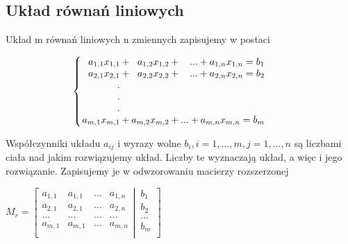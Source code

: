 \documentclass{article}
\begin{document}
\subsection{Układ równań liniowych}\label{Układ równań liniowych}
Układ m równań liniowych n zmiennych zapisujemy w postaci 
\begin{center}
    \[
\setlength\arraycolsep{1pt}
\left\{
\begin{array}{rcrcrc@{\qquad}l}
a_{1,1}x_{1,1} &+&   a_{1,2}x_{1,2} & + & ... + a_{1,n}x_{1,n} = b_{1}\\
a_{2,1}x_{2,1} &+&   a_{2,2}x_{2,2} & + & ... + a_{2,n}x_{2,n} = b_{2}\\
 . &  &      &   &       &      &   \\
 . &  &      &   &       &      &   \\
 . &  &      &   &       &      &   \\
a_{m,1}x_{m,1} &+&   a_{m,2}x_{m,2} & + & ... + a_{m,n}x_{m,n} = b_{m}
\end{array}
\right.
\]
\end{center}

Współczynniki układu \begin{math}a_{ij}\end{math} i wyrazy wolne \begin{math}b_{i}, i = 1,...,m, j = 1,...,n\end{math} są liczbami ciała nad jakim rozwiązujemy układ. Liczby te wyznaczają układ, a więc i jego rozwiązanie. Zapisujemy je w odwzorowaniu macierzy rozszerzonej

\begin{center}
    \begin{math}
    M_{r}=
\left[
  \begin{matrix}
    a_{1,1} & a_{1,1} & ... & a_{1,n} \\
    a_{2,1} & a_{2,1} & ... & a_{2,n} \\
    ... & ... & ... & ... \\
    a_{m,1} & a_{m,1} & ... & a_{m,n} \\
  \end{matrix}
  \left|
    \,
    \begin{matrix}
      b_{1}  \\
      b_{2}  \\
      ...  \\
      b_{m}  \\
    \end{matrix}
  \right.
\right]
\end{math}
\end{center}
\end{document}
